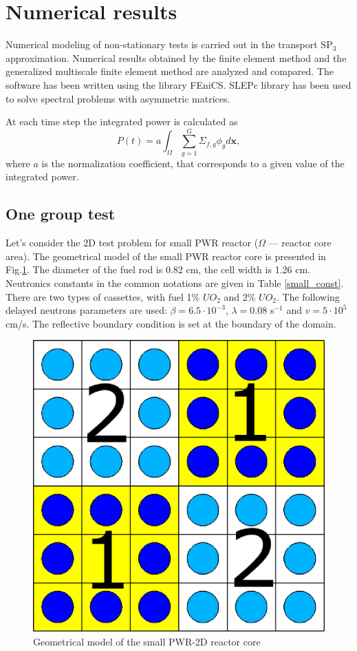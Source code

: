 \documentclass[preprint]{elsarticle}
\begin{document}
\section{Numerical results}
Numerical modeling of non-stationary tests is carried out in the transport SP$_3$ approximation.
Numerical results obtained by the finite element method and the generalized multiscale finite element method are analyzed and compared.
The software has been written using the library FEniCS.
SLEPc library has been used to solve spectral problems with asymmetric matrices.

At each time step the integrated power is calculated as
	\[P(t) = a \int_{\Omega} \sum_{g=1}^{G} \Sigma_{f,g} \phi_g d \bm x,\]
where $a$ is the normalization coefficient, that corresponds to a given value of the integrated power.

\subsection{One group test} %
Let's consider the 2D test problem for small PWR reactor ($\Omega$ --- reactor core area). 
The geometrical model of the small PWR reactor core is presented in Fig.\ref{smallpwr}. 
The diameter of the fuel rod is 0.82 cm, the cell width is 1.26 cm.
Neutronics constants in the common notations are given in Table \ref{small_const}. 
There are two types of cassettes, with fuel 1\% $UO_2$ and 2\% $UO_2$.
The following delayed neutrons parameters are used: $\beta = 6.5 \cdot 10^{-3}$, $\lambda = 0.08$ s$^{-1}$ and $v = 5 \cdot 10^5$ cm/s.
The reflective boundary condition is set at the boundary of the domain.

\begin{figure}[ht]
	\centering
	    \includegraphics[width=0.45\linewidth] {small/smallpwr_geo.eps}
	\caption{Geometrical model of the small PWR-2D reactor core}
	\label{smallpwr}
\end{figure} 
\end{document}
